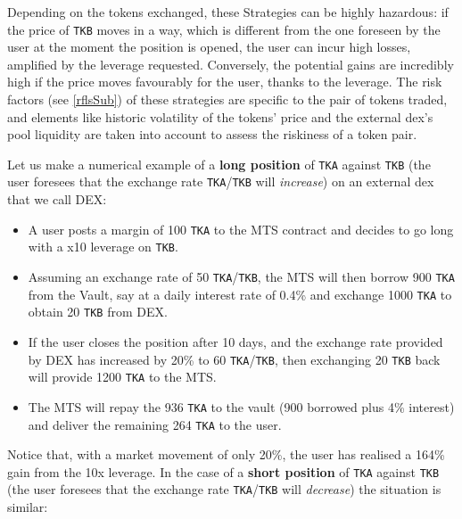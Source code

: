 \documentclass[a4paper,10 pt]{article}
\theoremstyle{definition}
\begin{document}
Depending on the tokens exchanged, these Strategies can be highly hazardous: if the price of \verb|TKB| moves in a way, which is different from the one foreseen by the user at the moment the position is opened, the user can incur high losses, amplified by the leverage requested. Conversely, the potential gains are incredibly high if the price moves favourably for the user, thanks to the leverage. The risk factors (see \ref{rflsSub}) of these strategies are specific to the pair of tokens traded, and elements like historic volatility of the tokens' price and the external dex's pool liquidity are taken into account to assess the riskiness of a token pair.

Let us make a numerical example of a {\bf long position} of \verb|TKA| against \verb|TKB| (the user foresees that the exchange rate \verb|TKA|/\verb|TKB| will {\it increase}) on an external dex that we call DEX:

\begin{itemize}
\item A user posts a margin of 100 \verb|TKA| to the MTS contract and decides to go long with a x10 leverage on \verb|TKB|.
\item Assuming an exchange rate of 50 \verb|TKA|/\verb|TKB|, the MTS will then borrow 900 \verb|TKA| from the Vault, say at a daily interest rate of 0.4\% and exchange 1000 \verb|TKA| to obtain 20 \verb|TKB| from DEX. 
\item If the user closes the position after 10 days, and the exchange rate provided by DEX has increased by 20\% to 60 \verb|TKA|/\verb|TKB|, then exchanging 20 \verb|TKB| back will provide 1200 \verb|TKA| to the MTS.
\item The MTS will repay the 936 \verb|TKA| to the vault (900 borrowed plus 4\% interest) and deliver the remaining 264 \verb|TKA| to the user.
\end{itemize}

Notice that, with a market movement of only 20\%, the user has realised a 164\% gain from the 10x leverage.
In the case of a {\bf short position} of \verb|TKA| against \verb|TKB| (the user foresees that the exchange rate \verb|TKA|/\verb|TKB| will {\it decrease}) the situation is similar:
\end{document}
